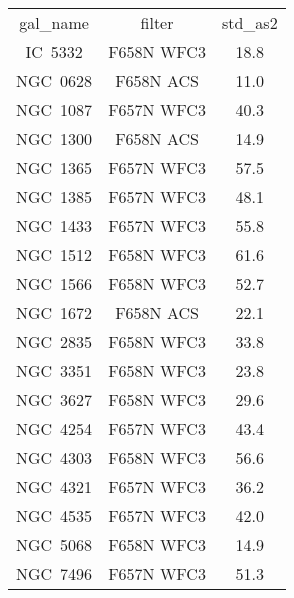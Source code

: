 \begin{table}
\begin{tabular}{ccc}
gal_name & filter & std_as2 \\
IC~5332 & F658N WFC3 & 18.8 \\
NGC~0628 & F658N ACS & 11.0 \\
NGC~1087 & F657N WFC3 & 40.3 \\
NGC~1300 & F658N ACS & 14.9 \\
NGC~1365 & F657N WFC3 & 57.5 \\
NGC~1385 & F657N WFC3 & 48.1 \\
NGC~1433 & F657N WFC3 & 55.8 \\
NGC~1512 & F658N WFC3 & 61.6 \\
NGC~1566 & F658N WFC3 & 52.7 \\
NGC~1672 & F658N ACS & 22.1 \\
NGC~2835 & F658N WFC3 & 33.8 \\
NGC~3351 & F658N WFC3 & 23.8 \\
NGC~3627 & F658N WFC3 & 29.6 \\
NGC~4254 & F657N WFC3 & 43.4 \\
NGC~4303 & F658N WFC3 & 56.6 \\
NGC~4321 & F657N WFC3 & 36.2 \\
NGC~4535 & F657N WFC3 & 42.0 \\
NGC~5068 & F658N WFC3 & 14.9 \\
NGC~7496 & F657N WFC3 & 51.3 \\
\end{tabular}
\end{table}
